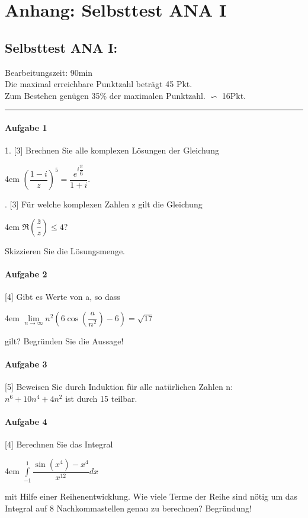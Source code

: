 \documentclass[11pt,final]{scrreprt}
\begin{document}
\part{Anhang: Selbsttest ANA I}	

\chapter{Selbsttest ANA I:}
Bearbeitungszeit: 90min\\
Die maximal erreichbare Punktzahl beträgt 45 Pkt.\\
Zum Bestehen genügen 35\% der maximalen Punktzahl. $\backsim$ 16Pkt.\hrule

\subsection*{Aufgabe 1}
1. [3] Brechnen Sie alle komplexen Lösungen der Gleichung

\begingroup
\leftskip4em
$ \left( \dfrac{1-i}{z} \right)^5 = \dfrac{e^{i\dfrac{\pi}{6}}}{1+i} $.\\
\par	
{}. [3] Für welche komplexen Zahlen z gilt die Gleichung

\begingroup
\leftskip4em 
$ \Re\left( \dfrac{\overline{z}}{z} \right) \leq 4 $?
\par	
\endgroup 
Skizzieren Sie die Lösungsmenge.
\subsection*{Aufgabe 2}
[4] Gibt es Werte von a, so dass

\begingroup
\leftskip4em 
$ \lim\limits_{n\to\infty}n^2 \left( 6\cos(\dfrac{a}{n^2})-6 \right) = \sqrt{17} $
\par	
\endgroup 
gilt? Begründen Sie die Aussage!
\subsection*{Aufgabe 3}
[5] Beweisen Sie durch Induktion für alle natürlichen Zahlen n:\\
$ n^6+10n^4+4n^2 $ ist durch 15 teilbar.
\subsection*{Aufgabe 4}
[4] Berechnen Sie das Integral

\begingroup
\leftskip4em 
$ \int\limits_{-1}^1\dfrac{\sin(x^4)-x^4}{x^{12}} dx $
\par	
\endgroup 
mit Hilfe einer Reihenentwicklung. Wie viele Terme der Reihe sind nötig um das Integral auf 8 Nachkommastellen genau zu berechnen? Begründung!
\end{document}
